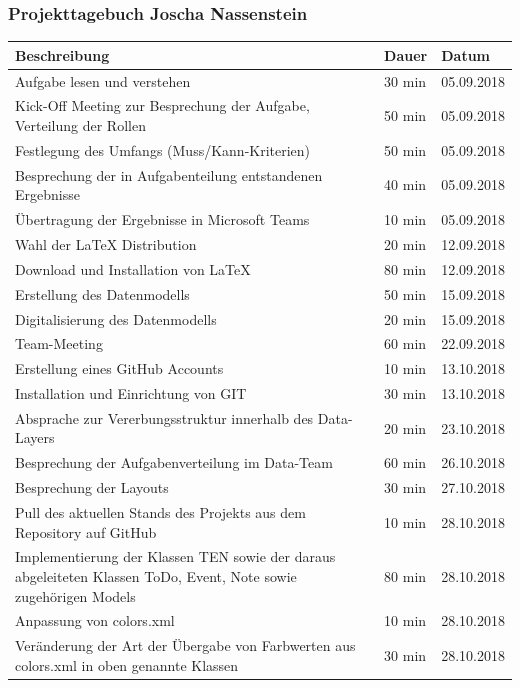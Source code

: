\subsubsection{Projekttagebuch Joscha Nassenstein}
\begin{longtable}{|p{10cm}|p{2cm}|p{2cm}|}
\hline
{\textbf{Beschreibung}} & {\textbf{Dauer}} & {\textbf{Datum}} \\ \hline
Aufgabe lesen und verstehen & 30 min & 05.09.2018 \\ \hline
Kick-Off Meeting zur Besprechung der Aufgabe, Verteilung der Rollen & 50 min & 05.09.2018 \\ \hline
Festlegung des Umfangs (Muss/Kann-Kriterien) & 50 min & 05.09.2018 \\ \hline
Besprechung der in Aufgabenteilung entstandenen Ergebnisse & 40 min & 05.09.2018 \\ \hline
Übertragung der Ergebnisse in Microsoft Teams & 10 min & 05.09.2018 \\ \hline
Wahl der LaTeX Distribution & 20 min & 12.09.2018 \\ \hline
Download und Installation von LaTeX & 80 min & 12.09.2018 \\ \hline
Erstellung des Datenmodells & 50 min & 15.09.2018 \\ \hline
Digitalisierung des Datenmodells & 20 min & 15.09.2018 \\ \hline
Team-Meeting & 60 min & 22.09.2018 \\ \hline
Erstellung eines GitHub Accounts & 10 min & 13.10.2018 \\ \hline
Installation und Einrichtung von GIT & 30 min & 13.10.2018 \\ \hline
Absprache zur Vererbungsstruktur innerhalb des Data-Layers  & 20 min & 23.10.2018 \\ \hline
Besprechung der Aufgabenverteilung im Data-Team & 60 min & 26.10.2018 \\ \hline
Besprechung der Layouts & 30 min & 27.10.2018 \\ \hline
Pull des aktuellen Stands des Projekts aus dem Repository auf GitHub & 10 min & 28.10.2018 \\ \hline
Implementierung der Klassen TEN sowie der daraus abgeleiteten Klassen ToDo, Event, Note sowie zugehörigen Models & 80 min & 28.10.2018 \\ \hline
Anpassung von colors.xml  & 10 min & 28.10.2018 \\ \hline
Veränderung der Art der Übergabe von Farbwerten aus colors.xml in oben genannte Klassen & 30 min & 28.10.2018 \\ \hline

\end{longtable}
